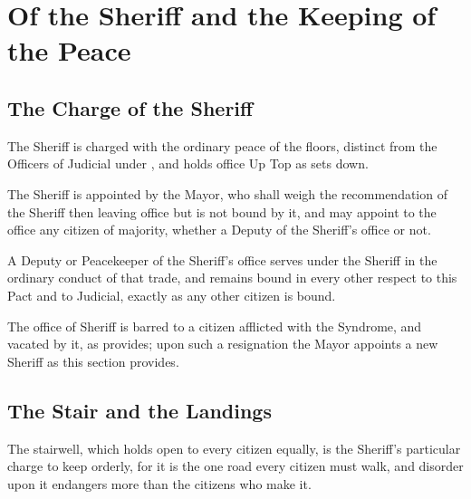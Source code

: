\chapter{Of the Sheriff and the Keeping of the Peace}
\label{art:sheriff}


\section{The Charge of the Sheriff}
\label{sec:sheriff:charge-of-the-sheriff}

The Sheriff is charged with the ordinary peace of the floors, distinct from the Officers of Judicial under , and holds office Up Top as  sets down.

\begin{clauses}
\item The Sheriff is appointed by the Mayor, who shall weigh the recommendation of the Sheriff then leaving office but is not bound by it, and may appoint to the office any citizen of majority, whether a Deputy of the Sheriff's office or not.
\item A Deputy or Peacekeeper of the Sheriff's office serves under the Sheriff in the ordinary conduct of that trade, and remains bound in every other respect to this Pact and to Judicial, exactly as any other citizen is bound.
\item The office of Sheriff is barred to a citizen afflicted with the Syndrome, and vacated by it, as  provides; upon such a resignation the Mayor appoints a new Sheriff as this section provides.
\end{clauses}

\section{The Stair and the Landings}
\label{sec:sheriff:stair-and-the-landings}

The stairwell, which  holds open to every citizen equally, is the Sheriff's particular charge to keep orderly, for it is the one road every citizen must walk, and disorder upon it endangers more than the citizens who make it.

